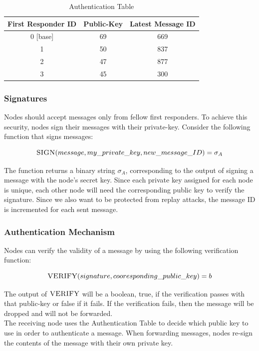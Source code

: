 \documentclass[letterpaper]{article}
\begin{document}
\begin{table}[ht]
\caption{Authentication Table} %
\centering %
\begin{tabular}{c c c } %
\hline
\hline %
First Responder ID & Public-Key & Latest Message ID  \\[0.5ex] %
\hline %
0 [base] & 69 & 669\\
1 & 50 & 837\\
2 & 47 & 877 \\
3 & 45 & 300\\ [1ex]
\hline
\end{tabular}
\label{table:nonlin}
\end{table}

\subsubsection{Signatures}

Nodes should accept messages only from fellow first responders. 
To achieve this security, nodes sign their messages with their private-key. 
Consider the following function that signs messages:

$$\textsc{SIGN}(message, my\_private\_key, new\_message\_ID) = \sigma_{A}$$

\noindent The function returns a binary string $\sigma_{A}$, corresponding to the output of signing a message with the node's secret key. Since each private key assigned for each node is unique, each other node will need the corresponding public key to verify the signature. Since we also want to be protected from replay attacks, the message ID is incremented for each sent message.

\subsubsection{Authentication Mechanism}
Nodes can verify the validity of a message by using the following verification function:

$$\textsc{VERIFY}(signature, cooresponding\_public\_key) =  b $$

\noindent The output of $\textsc{VERIFY}$ will be a boolean, true, if the verification passes with that public-key or false if it fails. 
If the verification fails, then the message will be dropped and will not be forwarded.
\\
\noindent The receiving node uses the Authentication Table to decide which public key to use in order to authenticate a message.
When forwarding messages, nodes re-sign the contents of the message with their own private key.
\\
\end{document}
